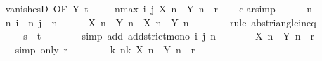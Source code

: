 \begin{isabellebody}
\ \ \ \ \isamarkupfalse%
\ vanishesD\ {\isacharbrackleft}{\kern0pt}OF\ Y\ t{\isacharbrackright}{\kern0pt}\ \isacommand{{\isachardot}{\kern0pt}{\isachardot}{\kern0pt}}\isamarkupfalse%
\isanewline
\ \ \isamarkupfalse%
\ {\isachardoublequoteopen}{\isasymforall}n{\isasymge}max\ i\ j{\isachardot}{\kern0pt}\ {\isasymbar}X\ n\ {\isacharplus}{\kern0pt}\ Y\ n{\isasymbar}\ {\isacharless}{\kern0pt}\ r{\isachardoublequoteclose}\isanewline
\ \ \isamarkupfalse%
\ clarsimp\isanewline
\ \ \ \ \isamarkupfalse%
\ n\isanewline
\ \ \ \ \isamarkupfalse%
\ n{\isacharcolon}{\kern0pt}\ {\isachardoublequoteopen}i\ {\isasymle}\ n{\isachardoublequoteclose}\ {\isachardoublequoteopen}j\ {\isasymle}\ n{\isachardoublequoteclose}\isanewline
\ \ \ \ \isamarkupfalse%
\ {\isachardoublequoteopen}{\isasymbar}X\ n\ {\isacharplus}{\kern0pt}\ Y\ n{\isasymbar}\ {\isasymle}\ {\isasymbar}X\ n{\isasymbar}\ {\isacharplus}{\kern0pt}\ {\isasymbar}Y\ n{\isasymbar}{\isachardoublequoteclose}\isanewline
\ \ \ \ \ \ \isamarkupfalse%
\ {\isacharparenleft}{\kern0pt}rule\ abs{\isacharunderscore}{\kern0pt}triangle{\isacharunderscore}{\kern0pt}ineq{\isacharparenright}{\kern0pt}\isanewline
\ \ \ \ \isamarkupfalse%
\ \isamarkupfalse%
\ {\isachardoublequoteopen}{\isasymdots}\ {\isacharless}{\kern0pt}\ s\ {\isacharplus}{\kern0pt}\ t{\isachardoublequoteclose}\isanewline
\ \ \ \ \ \ \isamarkupfalse%
\ {\isacharparenleft}{\kern0pt}simp\ add{\isacharcolon}{\kern0pt}\ add{\isacharunderscore}{\kern0pt}strict{\isacharunderscore}{\kern0pt}mono\ i\ j\ n{\isacharparenright}{\kern0pt}\isanewline
\ \ \ \ \isamarkupfalse%
\ \isamarkupfalse%
\ {\isachardoublequoteopen}{\isasymbar}X\ n\ {\isacharplus}{\kern0pt}\ Y\ n{\isasymbar}\ {\isacharless}{\kern0pt}\ r{\isachardoublequoteclose}\isanewline
\ \ \ \ \ \ \isamarkupfalse%
\ {\isacharparenleft}{\kern0pt}simp\ only{\isacharcolon}{\kern0pt}\ r{\isacharparenright}{\kern0pt}\isanewline
\ \ \isamarkupfalse%
\isanewline
\ \ \isamarkupfalse%
\ \isamarkupfalse%
\ {\isachardoublequoteopen}{\isasymexists}k{\isachardot}{\kern0pt}\ {\isasymforall}n{\isasymge}k{\isachardot}{\kern0pt}\ {\isasymbar}X\ n\ {\isacharplus}{\kern0pt}\ Y\ n{\isasymbar}\ {\isacharless}{\kern0pt}\ r{\isachardoublequoteclose}\ \isacommand{{\isachardot}{\kern0pt}{\isachardot}{\kern0pt}}\isamarkupfalse%
\isanewline
{}\isamarkupfalse%
%
\endisatagproof

\end{isabellebody}
